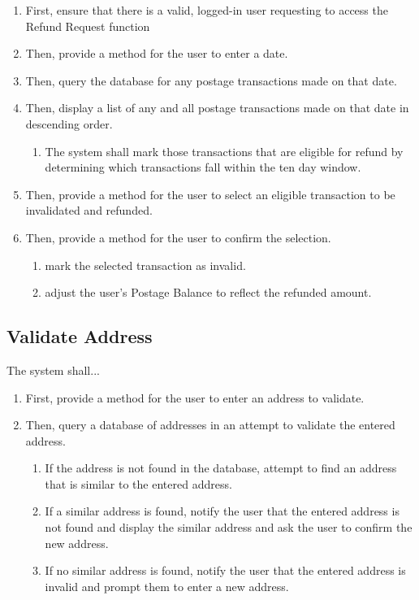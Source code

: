 \documentclass{scrreprt}
\begin{document}
\begin{enumerate}
\item First, ensure that there is a valid, logged-in user requesting to access
the Refund Request function
\item Then, provide a method for the user to enter a date.
\item Then, query the database for any postage transactions
made on that date.
\item Then, display a list of any and all postage transactions
made on that date in descending order.
\begin{enumerate}
\item The system shall mark those transactions that are eligible for refund by
determining which transactions fall within the ten day window.  
\end{enumerate}
\item Then, provide a method for the user to select an
eligible transaction to be invalidated and refunded.
\item Then, provide a method for the user to confirm the
selection.
\begin{enumerate}
\item mark the selected transaction as invalid.
\item adjust the user’s Postage Balance to reflect the
refunded amount.
\end{enumerate}
\end{enumerate}

\subsection{Validate Address}

The system shall...

\begin{enumerate}
\item First, provide a method for the user to enter an address to validate.
\item Then, query a database of addresses in an attempt to
validate the entered address.
\begin{enumerate}
\item If the address is not found in the database, attempt to find an address
that is similar to the entered address.
\item If a similar address is found, notify the user that the entered address
is not found and display the similar address and ask the user to confirm the
new address.
\item If no similar address is found, notify the user that the entered address
is invalid and prompt them to enter a new address.
\end{enumerate}
\end{enumerate}
\end{document}

